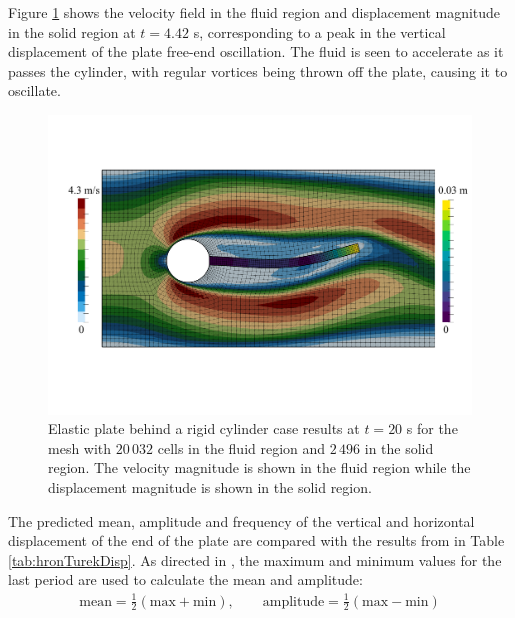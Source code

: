 \documentclass[sn-mathphys,Numbered]{sn-jnl}%
\begin{document}
Figure \ref{fig:hronTurek-results} shows the velocity field in the fluid region and displacement magnitude in the solid region at $t = 4.42$ s, corresponding to a peak in the vertical displacement of the plate free-end oscillation.
The fluid is seen to accelerate as it passes the cylinder, with regular vortices being thrown off the plate, causing it to oscillate.
\begin{figure}[htbp]
   \centering
	   \includegraphics[width=\textwidth]{figures/hronTurek-results} 
   \caption{Elastic plate behind a rigid cylinder case results at $t = 20$ s for the mesh with $20\,032$ cells in the fluid region and $2\,496$ in the solid region. The velocity magnitude is shown in the fluid region while the displacement magnitude is shown in the solid region.}
   \label{fig:hronTurek-results}
\end{figure}
The predicted mean, amplitude and frequency of the vertical and horizontal displacement of the end of the plate are compared with the results from \citet{Turek2006} in Table \ref{tab:hronTurekDisp}.
As directed in \citet{Turek2006}, the maximum and minimum values for the last period are used to calculate the mean and amplitude:
\begin{eqnarray}
	\text{mean} = \frac{1}{2}(\text{max} + \text{min}), \quad\quad
	\text{amplitude} = \frac{1}{2}(\text{max} - \text{min})
\end{eqnarray}
\end{document}
